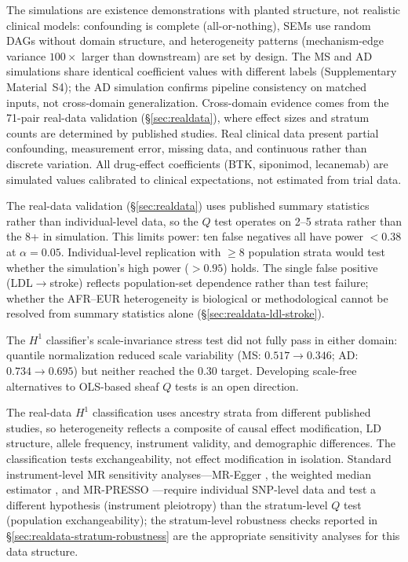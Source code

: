 \documentclass[11pt]{article}
\begin{document}
The simulations are existence demonstrations with planted structure, not realistic clinical models: confounding is complete (all-or-nothing), SEMs use random DAGs without domain structure, and heterogeneity patterns (mechanism-edge variance $100\times$ larger than downstream) are set by design.
The MS and AD simulations share identical coefficient values with different labels (Supplementary Material~S4); the AD simulation confirms pipeline consistency on matched inputs, not cross-domain generalization. Cross-domain evidence comes from the 71-pair real-data validation (\S\ref{sec:realdata}), where effect sizes and stratum counts are determined by published studies.
Real clinical data present partial confounding, measurement error, missing data, and continuous rather than discrete variation.
All drug-effect coefficients (BTK, siponimod, lecanemab) are simulated values calibrated to clinical expectations, not estimated from trial data.

The real-data validation (\S\ref{sec:realdata}) uses published summary statistics rather than individual-level data, so the $Q$ test operates on 2--5 strata rather than the 8+ in simulation.
This limits power: ten false negatives all have power $< 0.38$ at $\alpha = 0.05$.
Individual-level replication with $\geq 8$ population strata would test whether the simulation's high power ($> 0.95$) holds.
The single false positive (LDL$\to$stroke) reflects population-set dependence rather than test failure; whether the AFR--EUR heterogeneity is biological or methodological cannot be resolved from summary statistics alone (\S\ref{sec:realdata-ldl-stroke}).

The $H^1$ classifier's scale-invariance stress test did not fully pass in either domain: quantile normalization reduced scale variability (MS: $0.517 \to 0.346$; AD: $0.734 \to 0.695$) but neither reached the $0.30$ target.
Developing scale-free alternatives to OLS-based sheaf $Q$ tests is an open direction.

The real-data $H^1$ classification uses ancestry strata from different published studies, so heterogeneity reflects a composite of causal effect modification, LD structure, allele frequency, instrument validity, and demographic differences.
The classification tests exchangeability, not effect modification in isolation.
Standard instrument-level MR sensitivity analyses---MR-Egger \citep{bowden2015mendelian}, the weighted median estimator \citep{bowden2016consistent}, and MR-PRESSO \citep{verbanck2018detection}---require individual SNP-level data and test a different hypothesis (instrument pleiotropy) than the stratum-level $Q$ test (population exchangeability); the stratum-level robustness checks reported in \S\ref{sec:realdata-stratum-robustness} are the appropriate sensitivity analyses for this data structure.
\end{document}
